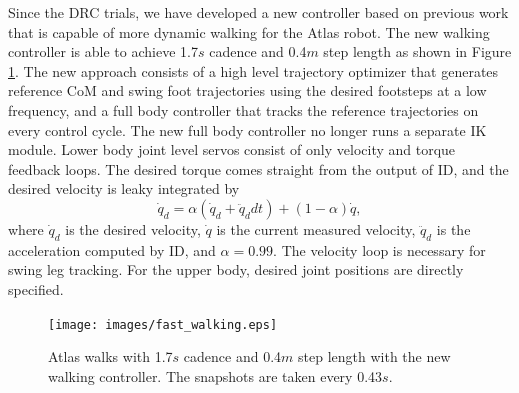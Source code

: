 \documentclass{ws-ijhr}
\newcommand{\fref}[1] {Figure \ref{#1}}
\begin{document}
Since the DRC trials, we have developed a new controller based on previous 
work \cite{sfeng_online,sfeng_proposal} that is capable of more dynamic walking
for the Atlas robot. 
The new walking controller is able to achieve 1.7$s$ cadence and 0.4$m$
step length as shown in \fref{fig:fast_walking}. 
The new approach consists of a high level trajectory optimizer that generates
reference CoM and swing foot trajectories using the desired footsteps at a low
frequency, and a full body controller that tracks the reference trajectories 
on every control cycle. 
The new full body controller no longer runs a separate IK module. 
Lower body joint level servos consist of only velocity and torque feedback 
loops. 
The desired torque comes straight from the output of ID, and the desired 
velocity is leaky integrated by
\begin{equation}
  \dot{q}_d = \alpha (\dot{q}_d + \ddot{q}_d dt) + (1-\alpha) \dot{q},
	\label{eq:qd_int}
\end{equation} 
where $\dot{q}_d$ is the desired velocity, $\dot{q}$ is the current 
measured velocity, $\ddot{q}_d$ is the acceleration computed by ID, and $\alpha = 0.99$. 
The velocity loop is necessary for swing leg tracking. 
For the upper body, desired joint positions are directly specified.

\begin{figure} 
  \begin{center}
    {\texttt{[image: images/fast\_walking.eps]}}
    \caption{Atlas walks with 1.7$s$ cadence and 0.4$m$ step length with the
		new walking controller. The snapshots are taken every 0.43$s$.} 
		\label{fig:fast_walking}
  \end{center}
\end{figure}   


\end{document}
